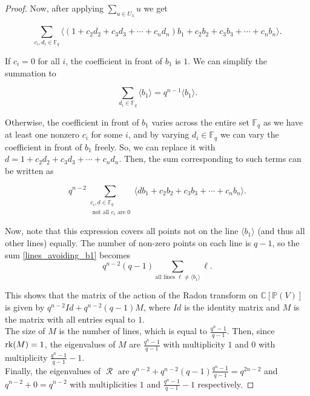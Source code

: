 \documentclass[12pt,reqno]{amsart}
\theoremstyle{definition}
\theoremstyle{remark}
\numberwithin{equation}{section}
\newcommand{\CC}{\mathbb{C}}
\DeclareMathOperator{\R}{\mathcal{R}}
\begin{document}
\begin{proof}
    Now, after applying $\sum_{u \in U_\lambda}u$ we get 
    
    \begin{equation*}
        \sum_{c_i, d_i \in \mathbb{F}_q} \langle(1+c_2d_2+c_3d_3 + \cdots + c_nd_n)b_1+c_2b_2 + c_3b_3 + \cdots +c_n b_n\rangle.
    \end{equation*}
    
    If $c_i = 0$ for all $i$, the coefficient in front of $b_1$ is $1$. We can simplify the summation to
    
    \begin{equation*}
        \sum_{d_i \in \mathbb{F}_q} \langle b_1 \rangle = q^{n-1} \langle b_1 \rangle.
    \end{equation*}
    
    Otherwise, the coefficient in front of $b_1$ varies across the entire set $\mathbb{F}_q$ as we have at least one nonzero $c_i$ for some $i$, and by varying $d_i \in \mathbb{F}_q$ we can vary the coefficient in front of $b_1$ freely. So, we can replace it with $d = 1+c_2d_2+c_3d_3 + \cdots + c_nd_n$. Then, the sum corresponding to such terms can be written as
    
    \begin{equation}\label{lines_avoiding_b1}
        q^{n-2}\sum_{\substack{c_i, d \in \mathbb{F}_q\\\text{ not all $c_i$ are }0}} \langle db_1+c_2b_2 + c_3b_3 + \cdots +c_n b_n \rangle.
    \end{equation}

    Now, note that this expression covers all points not on the line $\langle b_1 \rangle$ (and thus all other lines) equally. The number of non-zero points on each line is $q-1$, so the sum \eqref{lines_avoiding_b1} becomes
    \begin{equation*}
         q^{n-2}(q-1) \sum_{\text{all lines } \ell \ne \langle b_1 \rangle} \ell.
    \end{equation*}


    This shows that the matrix of the action of the Radon transform on $\CC[\mathbb{P}(V)]$ is given by $q^{n-2}Id + q^{n-2}(q-1)M$, where $Id$ is the identity matrix and $M$ is the matrix with all entries equal to $1$.\\

    The size of $M$ is the number of lines, which is equal to $\frac{q^n-1}{q-1}$. Then, since ${\rm rk}(M)=1$, the eigenvalues of $M$ are $\frac{q^n-1}{q-1}$ with multiplicity $1$ and $0$ with multiplicity $\frac{q^n-1}{q-1}-1$.\\

    Finally, the eigenvalues of $\R$ are $q^{n-2} + q^{n-2}(q-1)\frac{q^n-1}{q-1}=q^{2n-2}$ and $q^{n-2}+0=q^{n-2}$ with multiplicities $1$ and $\frac{q^n-1}{q-1}-1$ respectively.
\end{proof}
\end{document}
